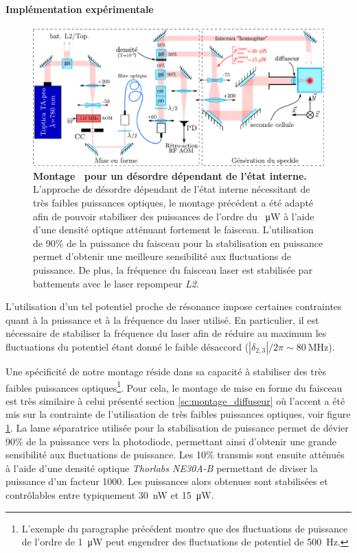 \paragraph*{Implémentation expérimentale}

\begin{figure}
\centering
\includegraphics[width=\textwidth]{Fig/Speckle/montage_speckle_specfunc.pdf}
\caption{\textbf{Montage \speckle\ pour un désordre dépendant de l'état interne.} L'approche de désordre dépendant de l'état interne nécessitant de très faibles puissances optiques, le montage précédent a été adapté afin de pouvoir stabiliser des puissances de l'ordre du \SI{}{\micro\watt} à l'aide d'une densité optique atténuant fortement le faisceau. L'utilisation de 90\% de la puissance du faisceau pour la stabilisation en puissance permet d'obtenir une meilleure sensibilité aux fluctuations de puissance. De plus, la fréquence du faisceau laser est stabilisée par battements avec le laser repompeur \emph{L2}.}
\label{fig:montage_speckle_specfunc}
\end{figure}

L'utilisation d'un tel potentiel proche de résonance impose certaines contraintes quant à la puissance et à la fréquence du laser utilisé. En particulier, il est nécessaire de stabiliser la fréquence du laser afin de réduire au maximum les fluctuations du potentiel étant donné le faible désaccord ($\left|\delta_{2,3}\right|/2\pi\sim\SI{80}{\mega\hertz}$).

Une spécificité de notre montage réside dans sa capacité à stabiliser des très faibles puissances optiques\footnote{L'exemple du paragraphe précédent montre que des fluctuations de puissance de l'ordre de \SI{1}{\micro\watt} peut engendrer des fluctuations de potentiel de \SI{500}{\hertz}.}. Pour cela, le montage de mise en forme du faisceau est très similaire à celui présenté section \ref{sc:montage_diffuseur} où l'accent a été mis sur la contrainte de l'utilisation de très faibles puissances optiques, voir figure \ref{fig:montage_speckle_specfunc}. La lame séparatrice utilisée pour la stabilisation de puissance permet de dévier 90\% de la puissance vers la photodiode, permettant ainsi d'obtenir une grande sensibilité aux fluctuations de puissance. Les 10\% transmis sont ensuite atténués à l'aide d'une densité optique \emph{Thorlabs NE30A-B} permettant de diviser la puissance d'un facteur 1000. Les puissances alors obtenues sont stabilisées et contrôlables entre typiquement \SI{30}{\nano\watt} et \SI{15}{\micro\watt}.




